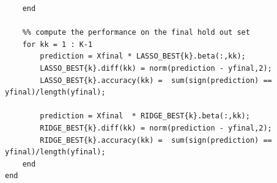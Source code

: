 \documentclass[paper=a4, fontsize=11pt]{scrartcl} %
\numberwithin{equation}{section} %
\numberwithin{figure}{section} %
\numberwithin{table}{section} %
\begin{document}
\begin{lstlisting}
    end
    
    %% compute the performance on the final hold out set 
    for kk = 1 : K-1
        prediction = Xfinal * LASSO_BEST{k}.beta(:,kk);
        LASSO_BEST{k}.diff(kk) = norm(prediction - yfinal,2); 
        LASSO_BEST{k}.accuracy(kk) =  sum(sign(prediction) == yfinal)/length(yfinal);
        
        prediction = Xfinal  * RIDGE_BEST{k}.beta(:,kk);
        RIDGE_BEST{k}.diff(kk) = norm(prediction - yfinal,2); 
        RIDGE_BEST{k}.accuracy(kk) =  sum(sign(prediction) == yfinal)/length(yfinal);
    end
end

\end{lstlisting}
\end{document}
